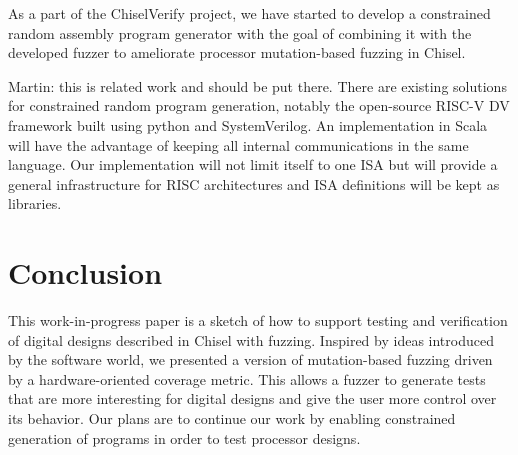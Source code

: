 \documentclass[conference]{IEEEtran}
\newcommand{\martin}[1]{{\color{blue} Martin: #1}}
\begin{document}
As a part of the ChiselVerify project, we have started to develop a constrained random assembly program generator with the goal of combining it with the developed fuzzer to ameliorate processor mutation-based fuzzing in Chisel.
%
%
%

\martin{this is related work and should be put there.}
There are existing solutions for constrained random program generation, notably the open-source RISC-V DV framework \cite{riscvdv} built using python and SystemVerilog. 
An implementation in Scala will have the advantage of keeping all internal communications in the same language. 
Our implementation will not limit itself to one ISA but will provide a general infrastructure for RISC architectures and ISA definitions will be kept as libraries.


\section{Conclusion}
\label{sec:conclusion}

This work-in-progress paper is a sketch of how to support testing and verification
of digital designs described in Chisel with fuzzing. 
Inspired by ideas introduced by the software world, we presented a version of mutation-based fuzzing driven by a hardware-oriented coverage metric.
This allows a fuzzer to generate tests that are more interesting for digital designs and give the user more control over its behavior. 
Our plans are to continue our work by enabling constrained generation of programs in order to test processor designs.
\end{document}
